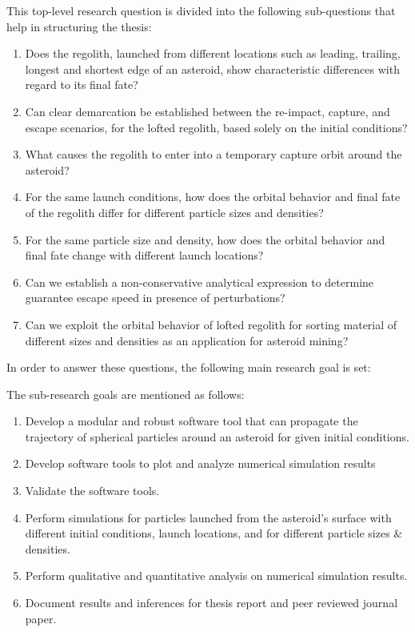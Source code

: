 \vspace{5mm}
This top-level research question is divided into the following sub-questions that help in structuring the thesis:
\begin{enumerate}
\item Does the regolith, launched from different locations such as leading, trailing, longest and shortest edge of an asteroid, show characteristic differences with regard to its final fate?
\item Can clear demarcation be established between the re-impact, capture, and escape scenarios, for the lofted regolith, based solely on the initial conditions?
\item What causes the regolith to enter into a temporary capture orbit around the asteroid?
\item For the same launch conditions, how does the orbital behavior and final fate of the regolith differ for different particle sizes and densities?
\item For the same particle size and density, how does the orbital behavior and final fate change with different launch locations?
\item Can we establish a non-conservative analytical expression to determine guarantee escape speed in presence of perturbations?
\item Can we exploit the orbital behavior of lofted regolith for sorting material of different sizes and densities as an application for asteroid mining?
\end{enumerate}
\vspace{5mm}
In order to answer these questions, the following main research goal is set:
\begin{center}
\end{center}
The sub-research goals are mentioned as follows:
\begin{enumerate}
\item Develop a modular and robust software tool that can propagate the trajectory of spherical particles around an asteroid for given initial conditions.
\item Develop software tools to plot and analyze numerical simulation results
\item Validate the software tools.
\item Perform simulations for particles launched from the asteroid's surface with different initial conditions, launch locations, and for different particle sizes \& densities.
\item Perform qualitative and quantitative analysis on numerical simulation results.
\item Document results and inferences for thesis report and peer reviewed journal paper.
\end{enumerate}
